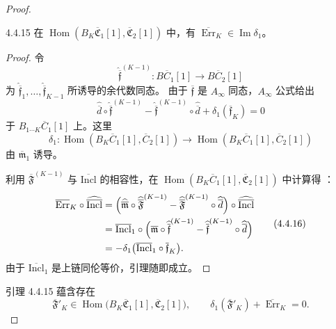 \begin{proof}
\begin{lemma}{4.4.15}\label{lem:4-4-15}
在
$\operatorname{Hom}(B_K\overline{\mathfrak C}_1[1],
\overline{\mathfrak C}_2[1])$ 中，有
$\overline{\operatorname{Err}}_K\in\operatorname{Im}\delta_1$。
\end{lemma}

\begin{proof}
令
\[
 \widehat{\overline{\mathfrak f}}^{(K-1)}\colon
 B\overline C_1[1]\longrightarrow B\overline C_2[1]
\]
为 $\widehat{\overline{\mathfrak f}}_1,\ldots,
\widehat{\overline{\mathfrak f}}_{K-1}$ 所诱导的余代数同态。
由于 $\overline{\mathfrak f}$ 是 $A_\infty$ 同态，$A_\infty$ 公式给出
\[
 \widehat{\overline d}
 \circ\widehat{\overline{\mathfrak f}}^{(K-1)}
 -\widehat{\overline{\mathfrak f}}^{(K-1)}
 \circ\widehat{\overline d}
 +\delta_1(\overline{\mathfrak f}_K)=0
\]
于 $B_{1\cdots K}\overline C_1[1]$ 上。这里
\[
 \delta_1\colon
 \operatorname{Hom}(B_K\overline C_1[1],\overline C_2[1])
 \longrightarrow
 \operatorname{Hom}(B_K\overline C_1[1],\overline C_2[1])
\]
由 $\overline{\mathfrak m}_1$ 诱导。

利用 $\overline{\mathfrak F}^{(K-1)}$ 与
$\overline{\mathrm{Incl}}$ 的相容性，在
$\operatorname{Hom}(B_K\overline C_1[1],
\overline{\mathfrak C}_2[1])$ 中计算得
：
\begin{equation}
 \begin{aligned}
 \overline{\operatorname{Err}}_K
 \circ\widehat{\overline{\mathrm{Incl}}}
 &={}
 \Bigl(
 \widehat{\overline{\mathfrak m}}
 \circ\widehat{\overline{\mathfrak F}}^{(K-1)}
 -\widehat{\overline{\mathfrak F}}^{(K-1)}
 \circ\widehat{\overline d}
 \Bigr)
 \circ\widehat{\overline{\mathrm{Incl}}}\\
 &=\overline{\mathrm{Incl}}_1\circ
 \Bigl(
 \overline{\mathfrak m}
 \circ\widehat{\overline{\mathfrak f}}^{(K-1)}
 -\widehat{\overline{\mathfrak f}}^{(K-1)}
 \circ\widehat{\overline d}
 \Bigr)\\
 &=-\delta_1\bigl(
 \overline{\mathrm{Incl}}_1
 \circ\overline{\mathfrak f}_K
 \bigr).
 \end{aligned}
\tag{4.4.16}\label{eq:4-4-16}
\end{equation}
由于 $\overline{\mathrm{Incl}}_1$ 是上链同伦等价，引理随即成立。
\end{proof}

引理 4.4.15 蕴含存在
\[
 \overline{\mathfrak F}'_K
 \in\operatorname{Hom}\bigl(
 B_K\overline{\mathfrak C}_1[1],
 \overline{\mathfrak C}_2[1]
 \bigr),
 \qquad
 \delta_1(\overline{\mathfrak F}'_K)
 +\overline{\operatorname{Err}}_K=0.
\]


\end{proof}
